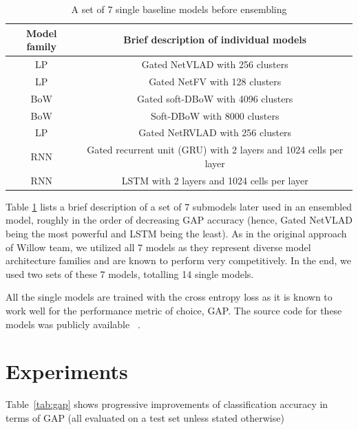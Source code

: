 \documentclass[runningheads]{llncs}
\begin{document}
\begin{table}[h!]
  \begin{center}
    \caption{A set of 7 single baseline models before ensembling}
    \label{tab:single_models}

    \begin{tabular}{ c | c }
      Model family & Brief description of individual models  \\
    \hline
    \hline
            LP & Gated NetVLAD with 256 clusters \\
    \hline
            LP & Gated NetFV with 128 clusters \\
    \hline
            BoW & Gated soft-DBoW with 4096 clusters \\
    \hline
            BoW & Soft-DBoW with 8000 clusters \\
    \hline
            LP &  Gated NetRVLAD with 256 clusters \\
    \hline
            RNN & Gated recurrent unit (GRU) with 2 layers and 1024 cells per layer \\
    \hline
            RNN & LSTM with 2 layers and 1024 cells per layer \\
    \end{tabular}
  \end{center}
\end{table}

Table \ref{tab:single_models} lists a brief description of a set of 7 submodels later used in an ensembled model, roughly in the order of decreasing GAP accuracy (hence, Gated NetVLAD being the most powerful and LSTM being the least).
As in the original approach of Willow team, we utilized all 7 models as they represent diverse model architecture families and are known to perform very competitively.
In the end, we used two sets of these 7 models, totalling 14 single models.

All the single models are trained with the cross entropy loss as it is known to work well for the performance metric of choice, GAP.
The source code for these models was publicly available ~\cite{miech_github}.

\section{Experiments}
Table~\ref{tab:gap} shows progressive improvements of classification accuracy in terms of GAP (all evaluated on a test set unless stated otherwise)
\end{document}
